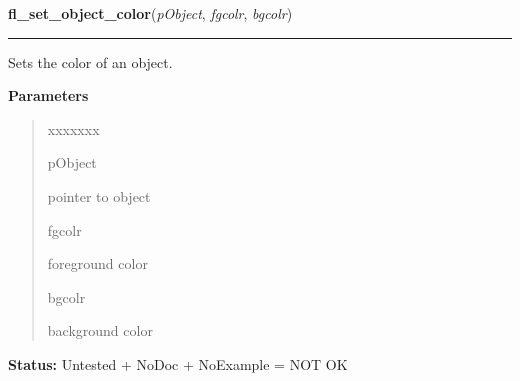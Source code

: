 \hspace{.8\funcindent}\begin{boxedminipage}{\funcwidth}

    \raggedright \textbf{fl\_set\_object\_color}(\textit{pObject}, \textit{fgcolr}, \textit{bgcolr})

    \vspace{-1.5ex}

    \rule{\textwidth}{0.5\fboxrule}
\setlength{\parskip}{2ex}
    Sets the color of an object.

\setlength{\parskip}{1ex}
      \textbf{Parameters}
      \vspace{-1ex}

      \begin{quote}
        \begin{Ventry}{xxxxxxx}

          \item[pObject]

          pointer to object

          \item[fgcolr]

          foreground color

          \item[bgcolr]

          background color

        \end{Ventry}

      \end{quote}

\textbf{Status:} Untested + NoDoc + NoExample = NOT OK



    \end{boxedminipage}

    \label{xformslib:library:fl_get_object_color}

    \vspace{0.5ex}

